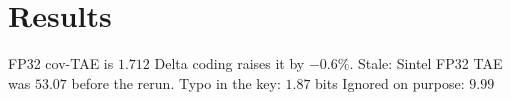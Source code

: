 \documentclass{article}
\begin{document}
\section{Results}
FP32 cov-TAE is $1.712$ %
Delta coding raises it by $-0.6\%$. %
Stale: Sintel FP32 TAE was $53.07$ before the rerun. %
Typo in the key: $1.87$ bits %
Ignored on purpose: $9.99$ %
\end{document}
